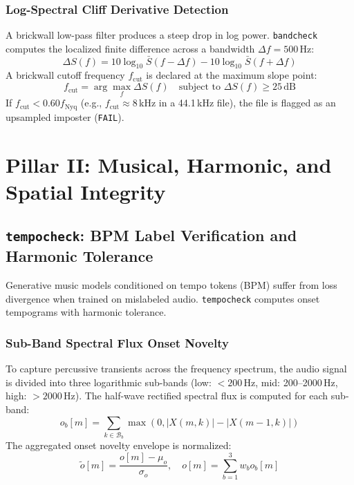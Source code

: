 \documentclass[10pt,journal,compsoc]{IEEEtran}
\begin{document}
\subsubsection{Log-Spectral Cliff Derivative Detection}
A brickwall low-pass filter produces a steep drop in log power. \texttt{bandcheck} computes the localized finite difference across a bandwidth $\Delta f = 500$\,Hz:
\begin{equation}
\Delta S(f) = 10 \log_{10} \bar{S}(f - \Delta f) - 10 \log_{10} \bar{S}(f + \Delta f)
\label{eq:spectral_cliff}
\end{equation}
A brickwall cutoff frequency $f_{\text{cut}}$ is declared at the maximum slope point:
\begin{equation}
f_{\text{cut}} = \arg\max_f \Delta S(f) \quad \text{subject to } \Delta S(f) \ge 25\,\text{dB}
\label{eq:cutoff_dec}
\end{equation}
If $f_{\text{cut}} < 0.60 f_{\text{Nyq}}$ (e.g., $f_{\text{cut}} \approx 8$\,kHz in a 44.1\,kHz file), the file is flagged as an upsampled imposter (\texttt{FAIL}).

\section{Pillar II: Musical, Harmonic, and Spatial Integrity}

\subsection{\texttt{tempocheck}: BPM Label Verification and Harmonic Tolerance}
Generative music models conditioned on tempo tokens (BPM) suffer from loss divergence when trained on mislabeled audio. \texttt{tempocheck} computes onset tempograms with harmonic tolerance.

\subsubsection{Sub-Band Spectral Flux Onset Novelty}
To capture percussive transients across the frequency spectrum, the audio signal is divided into three logarithmic sub-bands (low: $<200$\,Hz, mid: 200--2000\,Hz, high: $>2000$\,Hz). The half-wave rectified spectral flux is computed for each sub-band:
\begin{equation}
o_b[m] = \sum_{k \in \mathcal{B}_b} \max(0, |X(m, k)| - |X(m-1, k)|)
\label{eq:flux}
\end{equation}
The aggregated onset novelty envelope is normalized:
\begin{equation}
\tilde{o}[m] = \frac{o[m] - \mu_o}{\sigma_o}, \quad o[m] = \sum_{b=1}^3 w_b o_b[m]
\label{eq:norm_flux}
\end{equation}
\end{document}
